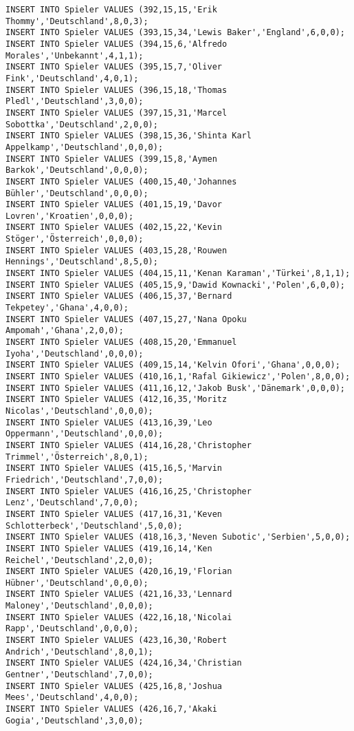 \documentclass{bschlangaul-aufgabe}
\begin{document}
\begin{verbatim}
INSERT INTO Spieler VALUES (392,15,15,'Erik Thommy','Deutschland',8,0,3);
INSERT INTO Spieler VALUES (393,15,34,'Lewis Baker','England',6,0,0);
INSERT INTO Spieler VALUES (394,15,6,'Alfredo Morales','Unbekannt',4,1,1);
INSERT INTO Spieler VALUES (395,15,7,'Oliver Fink','Deutschland',4,0,1);
INSERT INTO Spieler VALUES (396,15,18,'Thomas Pledl','Deutschland',3,0,0);
INSERT INTO Spieler VALUES (397,15,31,'Marcel Sobottka','Deutschland',2,0,0);
INSERT INTO Spieler VALUES (398,15,36,'Shinta Karl Appelkamp','Deutschland',0,0,0);
INSERT INTO Spieler VALUES (399,15,8,'Aymen Barkok','Deutschland',0,0,0);
INSERT INTO Spieler VALUES (400,15,40,'Johannes Bühler','Deutschland',0,0,0);
INSERT INTO Spieler VALUES (401,15,19,'Davor Lovren','Kroatien',0,0,0);
INSERT INTO Spieler VALUES (402,15,22,'Kevin Stöger','Österreich',0,0,0);
INSERT INTO Spieler VALUES (403,15,28,'Rouwen Hennings','Deutschland',8,5,0);
INSERT INTO Spieler VALUES (404,15,11,'Kenan Karaman','Türkei',8,1,1);
INSERT INTO Spieler VALUES (405,15,9,'Dawid Kownacki','Polen',6,0,0);
INSERT INTO Spieler VALUES (406,15,37,'Bernard Tekpetey','Ghana',4,0,0);
INSERT INTO Spieler VALUES (407,15,27,'Nana Opoku Ampomah','Ghana',2,0,0);
INSERT INTO Spieler VALUES (408,15,20,'Emmanuel Iyoha','Deutschland',0,0,0);
INSERT INTO Spieler VALUES (409,15,14,'Kelvin Ofori','Ghana',0,0,0);
INSERT INTO Spieler VALUES (410,16,1,'Rafal Gikiewicz','Polen',8,0,0);
INSERT INTO Spieler VALUES (411,16,12,'Jakob Busk','Dänemark',0,0,0);
INSERT INTO Spieler VALUES (412,16,35,'Moritz Nicolas','Deutschland',0,0,0);
INSERT INTO Spieler VALUES (413,16,39,'Leo Oppermann','Deutschland',0,0,0);
INSERT INTO Spieler VALUES (414,16,28,'Christopher Trimmel','Österreich',8,0,1);
INSERT INTO Spieler VALUES (415,16,5,'Marvin Friedrich','Deutschland',7,0,0);
INSERT INTO Spieler VALUES (416,16,25,'Christopher Lenz','Deutschland',7,0,0);
INSERT INTO Spieler VALUES (417,16,31,'Keven Schlotterbeck','Deutschland',5,0,0);
INSERT INTO Spieler VALUES (418,16,3,'Neven Subotic','Serbien',5,0,0);
INSERT INTO Spieler VALUES (419,16,14,'Ken Reichel','Deutschland',2,0,0);
INSERT INTO Spieler VALUES (420,16,19,'Florian Hübner','Deutschland',0,0,0);
INSERT INTO Spieler VALUES (421,16,33,'Lennard Maloney','Deutschland',0,0,0);
INSERT INTO Spieler VALUES (422,16,18,'Nicolai Rapp','Deutschland',0,0,0);
INSERT INTO Spieler VALUES (423,16,30,'Robert Andrich','Deutschland',8,0,1);
INSERT INTO Spieler VALUES (424,16,34,'Christian Gentner','Deutschland',7,0,0);
INSERT INTO Spieler VALUES (425,16,8,'Joshua Mees','Deutschland',4,0,0);
INSERT INTO Spieler VALUES (426,16,7,'Akaki Gogia','Deutschland',3,0,0);

\end{verbatim}
\end{document}
